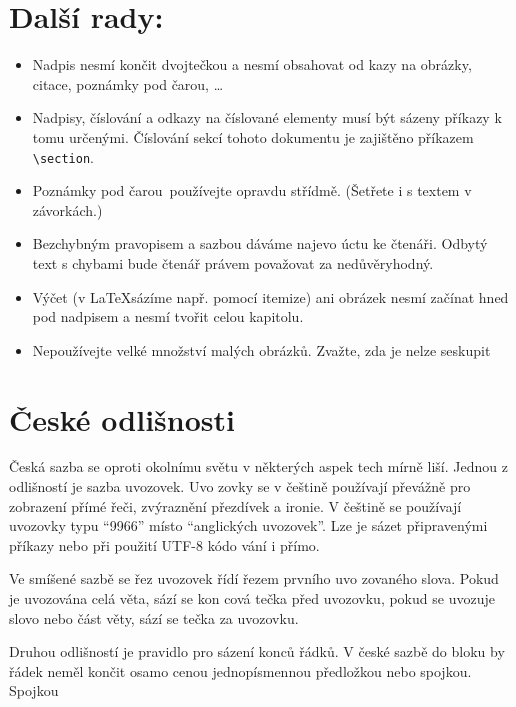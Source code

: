 \documentclass[twocolumn, 10pt, a4paper]{article}
\begin{document}
\section{Další rady:}
\begin{itemize}[left=0pt, label=•]
    \item Nadpis nesmí končit dvojtečkou a nesmí obsahovat od\-
        kazy na obrázky, citace, poznámky pod čarou, \ldots
    \item Nadpisy, číslování a odkazy na číslované elementy musí
        být sázeny příkazy k tomu určenými. Číslování sekcí
        tohoto dokumentu je zajištěno příkazem \verb|\section|.
\pagebreak
    \item
        Poznámky pod čarou\footnotemark~používejte opravdu střídmě.
        (Šetřete i s textem v závorkách.)
    \item
        Bezchybným pravopisem a sazbou dáváme najevo úctu
        ke čtenáři. Odbytý text s chybami bude čtenář právem
        považovat za nedůvěryhodný.
    \item
        Výčet (v \LaTeX sázíme např. pomocí itemize) ani
        obrázek nesmí začínat hned pod nadpisem a nesmí
        tvořit celou kapitolu.
    \item
        Nepoužívejte velké množství malých obrázků. Zvažte,
        zda je nelze seskupit
\end{itemize}
\section{České odlišnosti}
    Česká sazba se oproti okolnímu světu v některých aspek\-
    tech mírně liší. Jednou z odlišností je sazba uvozovek. Uvo\-
    zovky se v češtině používají převážně pro zobrazení přímé
    řeči, zvýraznění přezdívek a ironie. V češtině se používají
    uvozovky typu \enquote{9966} místo “anglických uvozovek”. Lze je
    sázet připravenými příkazy nebo při použití UTF-8 kódo\-
    vání i přímo.

    Ve smíšené sazbě se řez uvozovek řídí řezem prvního uvo\-
    zovaného slova. Pokud je uvozována celá věta, sází se kon\-
    cová tečka před uvozovku, pokud se uvozuje slovo nebo část
    věty, sází se tečka za uvozovku.

    Druhou odlišností je pravidlo pro sázení konců řádků.
    V české sazbě do bloku by řádek neměl končit osamo\-
    cenou jednopísmennou předložkou nebo spojkou. Spojkou
\end{document}

